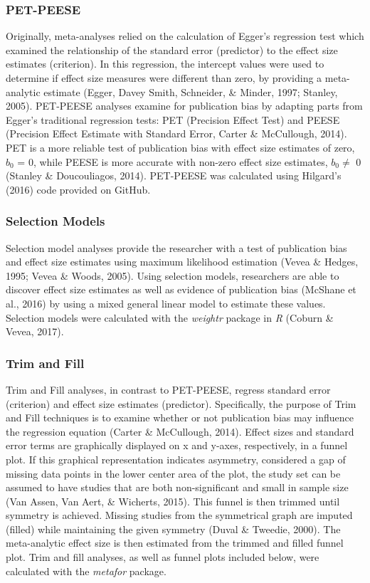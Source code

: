 \documentclass[english,man, mask]{apa6}
\theoremstyle{definition}
\theoremstyle{definition}
\theoremstyle{definition}
\theoremstyle{remark}
\begin{document}
\subsubsection{PET-PEESE}\label{pet-peese}

Originally, meta-analyses relied on the calculation of Egger's
regression test which examined the relationship of the standard error
(predictor) to the effect size estimates (criterion). In this
regression, the intercept values were used to determine if effect size
measures were different than zero, by providing a meta-analytic estimate
(Egger, Davey Smith, Schneider, \& Minder, 1997; Stanley, 2005).
PET-PEESE analyses examine for publication bias by adapting parts from
Egger's traditional regression tests: PET (Precision Effect Test) and
PEESE (Precision Effect Estimate with Standard Error, Carter \&
McCullough, 2014). PET is a more reliable test of publication bias with
effect size estimates of zero, \(b_0\) = 0, while PEESE is more accurate
with non-zero effect size estimates, \(b_0 \neq\) 0 (Stanley \&
Doucouliagos, 2014). PET-PEESE was calculated using Hilgard's (2016)
code provided on GitHub.

\subsubsection{Selection Models}\label{selection-models}

Selection model analyses provide the researcher with a test of
publication bias and effect size estimates using maximum likelihood
estimation (Vevea \& Hedges, 1995; Vevea \& Woods, 2005). Using
selection models, researchers are able to discover effect size estimates
as well as evidence of publication bias (McShane et al., 2016) by using
a mixed general linear model to estimate these values. Selection models
were calculated with the \emph{weightr} package in \emph{R} (Coburn \&
Vevea, 2017).

\subsubsection{Trim and Fill}\label{trim-and-fill}

Trim and Fill analyses, in contrast to PET-PEESE, regress standard error
(criterion) and effect size estimates (predictor). Specifically, the
purpose of Trim and Fill techniques is to examine whether or not
publication bias may influence the regression equation (Carter \&
McCullough, 2014). Effect sizes and standard error terms are graphically
displayed on x and y-axes, respectively, in a funnel plot. If this
graphical representation indicates asymmetry, considered a gap of
missing data points in the lower center area of the plot, the study set
can be assumed to have studies that are both non-significant and small
in sample size (Van Assen, Van Aert, \& Wicherts, 2015). This funnel is
then trimmed until symmetry is achieved. Missing studies from the
symmetrical graph are imputed (filled) while maintaining the given
symmetry (Duval \& Tweedie, 2000). The meta-analytic effect size is then
estimated from the trimmed and filled funnel plot. Trim and fill
analyses, as well as funnel plots included below, were calculated with
the \emph{metafor} package.
\end{document}
